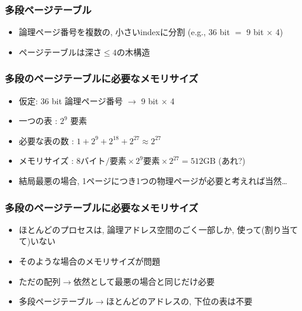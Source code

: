\documentclass[12pt,dvipdfmx]{beamer}
\begin{document}
\begin{frame}
  \frametitle{多段ページテーブル}
  \begin{itemize}
  \item 論理ページ番号を複数の, 小さいindexに分割
    (e.g., 36 bit $=$ 9 bit $\times$ 4)
  \item ページテーブルは深さ$\leq 4$の木構造
    
    
    \begin{center}
    \end{center}
  \end{itemize}
\end{frame}

\begin{frame}
  \frametitle{多段のページテーブルに必要なメモリサイズ}
  \begin{itemize}
  \item 仮定: 36 bit 論理ページ番号 $\rightarrow$ 9 bit $\times$ 4 
  \item 一つの表 : $2^9$ 要素
  \item 必要な表の数 : $1 + 2^9 + 2^{18} + 2^{27} \approx 2^{27}$
  \item メモリサイズ : $8 \mbox{バイト/要素} \times 2^9 \mbox{要素} \times 2^{27} = 512\mbox{GB}$ (あれ?)
  \item 結局最悪の場合, 1ページにつき1つの物理ページが必要と考えれば当然\ldots
  \end{itemize}
\end{frame}

\begin{frame}
  \frametitle{多段のページテーブルに必要なメモリサイズ}
  \begin{itemize}
  \item ほとんどのプロセスは, 論理アドレス空間のごく一部しか,
    使って(割り当てて)いない
  \item そのような場合のメモリサイズが問題
  \item ただの配列$\rightarrow$依然として最悪の場合と同じだけ必要
  \item 多段ページテーブル$\rightarrow$ほとんどのアドレスの, 下位の表は不要
  \end{itemize}
\end{frame}
\end{document}
